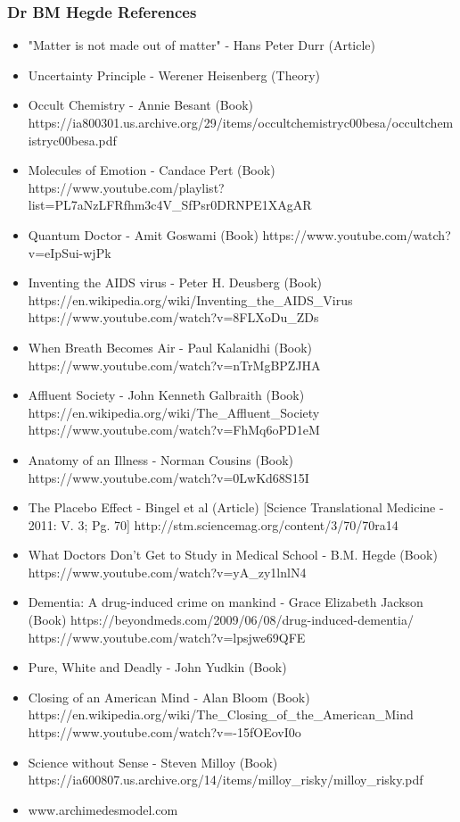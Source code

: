 \begin{frame}[fragile]\frametitle{Dr BM Hegde References}
	\begin{itemize}
	\item "Matter is not made out of matter" - Hans Peter Durr (Article)
	\item Uncertainty Principle - Werener Heisenberg (Theory)
	\item Occult Chemistry - Annie Besant (Book) https://ia800301.us.archive.org/29/items/occultchemistryc00besa/occultchemistryc00besa.pdf 
	\item Molecules of Emotion - Candace Pert (Book) https://www.youtube.com/playlist?list=PL7aNzLFRfhm3c4V\_SfPsr0DRNPE1XAgAR 
	\item Quantum Doctor - Amit Goswami (Book) https://www.youtube.com/watch?v=eIpSui-wjPk 
	\item Inventing the AIDS virus - Peter H. Deusberg (Book) https://en.wikipedia.org/wiki/Inventing\_the\_AIDS\_Virus  https://www.youtube.com/watch?v=8FLXoDu\_ZDs 
	\item When Breath Becomes Air - Paul Kalanidhi (Book) https://www.youtube.com/watch?v=nTrMgBPZJHA 
	\item Affluent Society - John Kenneth Galbraith (Book)  https://en.wikipedia.org/wiki/The\_Affluent\_Society https://www.youtube.com/watch?v=FhMq6oPD1eM 
	\item Anatomy of an Illness - Norman Cousins (Book) https://www.youtube.com/watch?v=0LwKd68S15I 
	\item The Placebo Effect - Bingel et al (Article) [Science Translational Medicine - 2011: V. 3; Pg. 70] http://stm.sciencemag.org/content/3/70/70ra14 
	\item What Doctors Don't Get to Study in Medical School - B.M. Hegde (Book) https://www.youtube.com/watch?v=yA\_zy1lnlN4 
	\item Dementia: A drug-induced crime on mankind - Grace Elizabeth Jackson (Book)  https://beyondmeds.com/2009/06/08/drug-induced-dementia/   https://www.youtube.com/watch?v=lpsjwe69QFE 
	\item Pure, White and Deadly - John Yudkin (Book)
	\item Closing of an American Mind - Alan Bloom (Book) https://en.wikipedia.org/wiki/The\_Closing\_of\_the\_American\_Mind  https://www.youtube.com/watch?v=-15fOEovI0o 
	\item Science without Sense - Steven Milloy (Book)  https://ia600807.us.archive.org/14/items/milloy\_risky/milloy\_risky.pdf 
	\item  www.archimedesmodel.com
	\end{itemize}

\end{frame}

